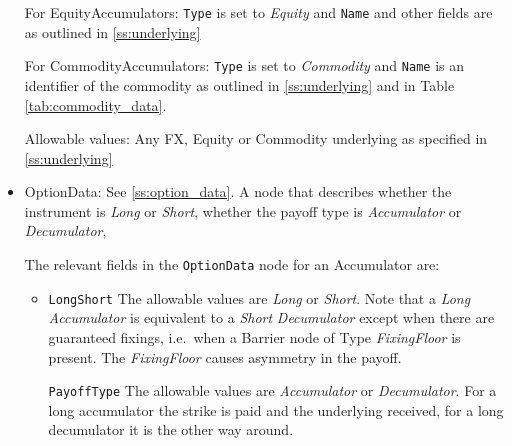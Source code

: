 \begin{itemize}
For EquityAccumulators: \lstinline!Type! is set to \emph{Equity} and \lstinline!Name! and other fields are as outlined in \ref{ss:underlying}

For CommodityAccumulators: \lstinline!Type! is set to \emph{Commodity} and \lstinline!Name! is an identifier of the commodity as outlined in \ref{ss:underlying} and in Table \ref{tab:commodity_data}.

    Allowable values: Any FX, Equity or Commodity underlying as specified in \ref{ss:underlying}
    
\item OptionData: See \ref{ss:option_data}. A node that describes whether the instrument is \emph{Long} or \emph{Short}, whether the payoff type is \emph{Accumulator} or \emph{Decumulator},  

The relevant fields in the \lstinline!OptionData! node for an Accumulator are:

\begin{itemize}
\item \lstinline!LongShort! The allowable values are \emph{Long} or \emph{Short}. Note that a \emph{Long} \emph{Accumulator} is equivalent to a \emph{Short} \emph{Decumulator} except when there are guaranteed fixings, i.e.\ when a Barrier node of Type \emph{FixingFloor} is present. The \emph{FixingFloor} causes asymmetry in the payoff.  

\lstinline!PayoffType! The allowable values are \emph{Accumulator} or \emph{Decumulator}. For a long accumulator the strike is paid and the underlying received, for a long decumulator it is the other way around.

\end{itemize}
    

\end{itemize}
